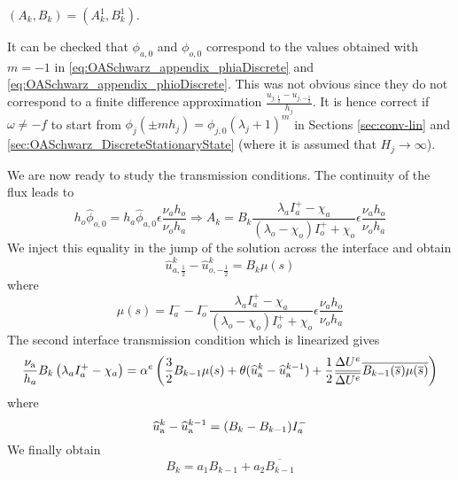 $(A_k, B_k) = (A_k^1, B_k^1)$.
\begin{remark}
It can be checked that $\phi_{a,0}$ and $\phi_{o,0}$
correspond to the values obtained with
$m=-1$ in
\eqref{eq:OASchwarz_appendix_phiaDiscrete} and
\eqref{eq:OASchwarz_appendix_phioDiscrete}. This
was not obvious since they do not correspond to a finite
difference approximation $\frac{u_{j, \frac{1}{2}} -
u_{j, -\frac{1}{2}}}{h_j}$.
It is hence correct if $\omega \neq -f$ to start from
	$\phi_j(\pm m h_j)= \phi_{j,0}(\lambda_j+1)^m$ in Sections
	\ref{sec:conv-lin} and \ref{sec:OASchwarz_DiscreteStationaryState} (where it is assumed that $H_j \rightarrow \infty$).
\end{remark}
We are now ready to study the transmission conditions.
The continuity of the flux leads to
\begin{equation}
    h_o \widehat{\phi}_{o,0} = h_a \widehat{\phi}_{a,0}
    \epsilon\frac{\nu_a h_o}
    {\nu_o h_a}
    \Rightarrow
	A_k = B_k \frac{\lambda_a I_a^{+} - \chi_a}
	{(\lambda_o - \chi_o)I_o^{+} + \chi_o}
    \epsilon\frac{\nu_a h_o}
    {\nu_o h_a}
\end{equation}
We inject this equality in the jump of the solution across
the interface and obtain
\begin{equation}
    \widehat{u}_{a,\frac{1}{2}}^k - \widehat{u}_{o,-\frac{1}{2}}^k
    = B_k \mu(s)
\end{equation}
where
\begin{equation}
	\mu(s) = I_a^{-} - I_o^{-}
\frac{\lambda_a I_a^{+} - \chi_a}
	{(\lambda_o - \chi_o)I_o^{+} + \chi_o}
    \epsilon\frac{\nu_a h_o}
    {\nu_o h_a}
\end{equation}
The second interface transmission condition which
is linearized gives
\begin{equation}
	\label{eq:OASchwarz_LinearizedAnalysis_relationBBarB}
\frac{\nu_{\rm a}}{h_a}B_k \left(\lambda_a I_a^{+} - \chi_a \right)
	=  \alpha^e \left(\frac{3}{2}B_{k-1} \mu(s)
+\theta ( \widehat{u}_{\rm a}^{k} -  \widehat{u}_{\rm a}^{k-1})
+ \frac{1}{2}\frac{\Delta U^e}{\overline{\Delta U^e}}
\overline{B_{k-1}(\overline{s}) \mu(\overline{s})}
\right)
\end{equation}
where
\begin{equation}
	\widehat{u}_{\rm a}^{k} -  \widehat{u}_{\rm a}^{k-1} = (B_k - B_{k-1})I_a^{-}
\end{equation}
We finally obtain
\begin{equation}
    B_k = a_1 B_{k-1} + a_2 \overline{B_{k-1}}
\end{equation}
